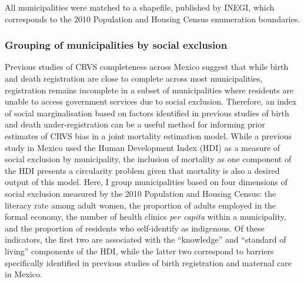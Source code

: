 \documentclass[
]{report}
\begin{document}
All municipalities were matched to a shapefile, published by INEGI, which corresponds to the 2010 Population and Housing Census enumeration boundaries.\autocite{INEGI2010b}

\hypertarget{grouping-of-municipalities-by-social-exclusion}{%
\subsubsection{Grouping of municipalities by social exclusion}\label{grouping-of-municipalities-by-social-exclusion}}

Previous studies of CRVS completeness across Mexico suggest that while birth and death registration are close to complete across most municipalities, registration remains incomplete in a subset of municipalities where residents are unable to access government services due to social exclusion. Therefore, an index of social marginalisation based on factors identified in previous studies of birth and death under-registration can be a useful method for informing prior estimates of CRVS bias in a joint mortality estimation model.\autocite{Hernandez2012,Enciso2017} While a previous study in Mexico used the Human Development Index (HDI) as a measure of social exclusion by municipality,\autocite{Hernandez2012} the inclusion of mortality as one component of the HDI presents a circularity problem given that mortality is also a desired output of this model. Here, I group municipalities based on four dimensions of social exclusion measured by the 2010 Population and Housing Census: the literacy rate among adult women, the proportion of adults employed in the formal economy, the number of health clinics \emph{per capita} within a municipality, and the proportion of residents who self-identify as indigenous. Of these indicators, the first two are associated with the ``knowledge'' and ``standard of living'' components of the HDI, while the latter two correspond to barriers specifically identified in previous studies of birth registration and maternal care in Mexico.\autocite{Enciso2017,Paulino2019,Gamlin2020}
\end{document}
